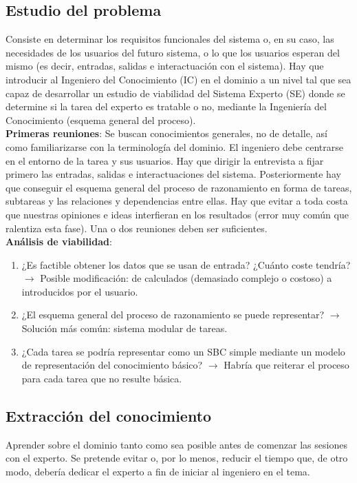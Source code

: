 \documentclass[12pt]{article}
\begin{document}
\subsection{Estudio del problema}
Consiste en determinar los requisitos funcionales del sistema o, en su caso, las necesidades de los usuarios del futuro sistema, o lo que los usuarios esperan del mismo (es decir, entradas, salidas e interactuación con el sistema). Hay que introducir al Ingeniero del Conocimiento (IC) en el dominio a un nivel tal que sea capaz de desarrollar un estudio de viabilidad del Sistema Experto (SE) donde se determine si la tarea del experto es tratable o no, mediante la Ingeniería del Conocimiento (esquema general del proceso).\\

\textbf{Primeras reuniones}: Se buscan conocimientos generales, no de detalle, así como familiarizarse con la terminología del dominio. El ingeniero debe centrarse en el entorno de la tarea y sus usuarios. Hay que dirigir la entrevista a fijar primero las entradas, salidas e interactuaciones del sistema. Posteriormente hay que conseguir el esquema general del proceso de razonamiento en forma de tareas, subtareas y las relaciones y dependencias entre ellas. Hay que evitar a toda costa que nuestras opiniones e ideas interfieran en los resultados (error muy común que ralentiza esta fase). Una o dos reuniones deben ser suficientes.\\

\textbf{Análisis de viabilidad}: 
\begin{enumerate}
\item ¿Es factible obtener los datos que se usan de entrada? ¿Cuánto coste tendría? $\longrightarrow$ Posible modificación: de calculados (demasiado complejo o costoso) a introducidos por el usuario.
\item ¿El esquema general del proceso de razonamiento se puede representar? $\longrightarrow$ Solución más común: sistema modular de tareas.
\item ¿Cada tarea se podría representar como un SBC simple mediante un modelo de representación del conocimiento básico? $\longrightarrow$ Habría que reiterar el proceso para cada tarea que no resulte básica.
\end{enumerate}

\subsection{Extracción del conocimiento}
Aprender sobre el dominio tanto como sea posible antes de comenzar las sesiones con el experto. Se pretende evitar o, por lo menos, reducir el tiempo que, de otro modo, debería dedicar el experto a fin de iniciar al ingeniero en el tema.\\
\end{document}

